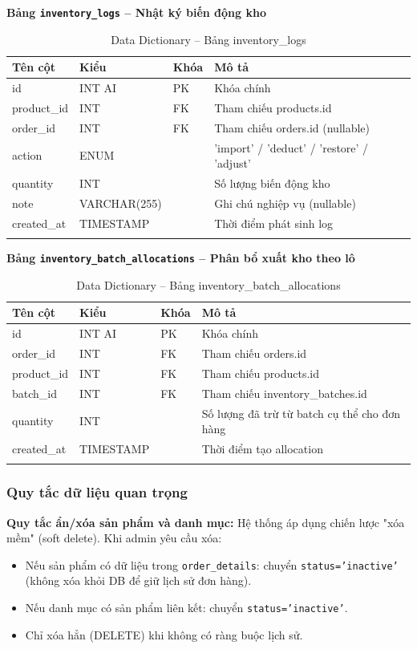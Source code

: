 \documentclass[a4paper]{article}
\begin{document}
\textbf{Bảng \texttt{inventory\_logs} -- Nhật ký biến động kho}

\begin{longtable}{|p{3.5cm}|p{2.5cm}|p{1.5cm}|p{5cm}|}
\hline
\textbf{Tên cột} & \textbf{Kiểu} & \textbf{Khóa} & \textbf{Mô tả} \\
\hline
\endhead
id & INT AI & PK & Khóa chính \\
\hline
product\_id & INT & FK & Tham chiếu products.id \\
\hline
order\_id & INT & FK & Tham chiếu orders.id (nullable) \\
\hline
action & ENUM & & 'import' / 'deduct' / 'restore' / 'adjust' \\
\hline
quantity & INT & & Số lượng biến động kho \\
\hline
note & VARCHAR(255) & & Ghi chú nghiệp vụ (nullable) \\
\hline
created\_at & TIMESTAMP & & Thời điểm phát sinh log \\
\hline
\caption{Data Dictionary -- Bảng inventory\_logs}
\end{longtable}

\textbf{Bảng \texttt{inventory\_batch\_allocations} -- Phân bổ xuất kho theo lô}

\begin{longtable}{|p{3.5cm}|p{2.5cm}|p{1.5cm}|p{5cm}|}
\hline
\textbf{Tên cột} & \textbf{Kiểu} & \textbf{Khóa} & \textbf{Mô tả} \\
\hline
\endhead
id & INT AI & PK & Khóa chính \\
\hline
order\_id & INT & FK & Tham chiếu orders.id \\
\hline
product\_id & INT & FK & Tham chiếu products.id \\
\hline
batch\_id & INT & FK & Tham chiếu inventory\_batches.id \\
\hline
quantity & INT & & Số lượng đã trừ từ batch cụ thể cho đơn hàng \\
\hline
created\_at & TIMESTAMP & & Thời điểm tạo allocation \\
\hline
\caption{Data Dictionary -- Bảng inventory\_batch\_allocations}
\end{longtable}

\subsubsection{Quy tắc dữ liệu quan trọng}

\textbf{Quy tắc ẩn/xóa sản phẩm và danh mục:}
Hệ thống áp dụng chiến lược "xóa mềm" (soft delete). Khi admin yêu cầu xóa:
\begin{itemize}
    \item Nếu sản phẩm có dữ liệu trong \texttt{order\_details}: chuyển \texttt{status='inactive'} (không xóa khỏi DB để giữ lịch sử đơn hàng).
    \item Nếu danh mục có sản phẩm liên kết: chuyển \texttt{status='inactive'}.
    \item Chỉ xóa hẳn (DELETE) khi không có ràng buộc lịch sử.
\end{itemize}
\end{document}
